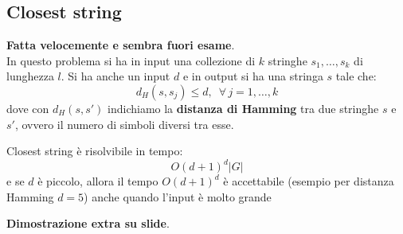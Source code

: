																      	\subsection{Closest string}
																      	\textbf{Fatta velocemente e sembra fuori esame}.\\
																      	In questo problema si ha in input una collezione di $k$ stringhe
																      	$s_1,\ldots,s_k$ di lunghezza $l$. Si ha anche un input $d$ e in output si ha
																      	una stringa $s$ tale che:
																      	\[d_H(s,s_j)\leq d,\,\,\,\forall\,j= 1,\ldots,k\]
																      	dove con $d_H(s,s')$ indichiamo la \textbf{distanza di Hamming} tra due stringhe
																      	$s$ e $s'$, ovvero il numero di simboli diversi tra esse.
																      	\begin{definizione}
																      		Closest string è risolvibile in tempo:
																      		\[O(d+1)^d|G|\]
																      		e se $d$ è piccolo, allora il tempo $O(d+1)^d$ è accettabile (esempio per
																      		distanza Hamming $d = 5$) anche quando l’input è molto grande  
																      	\end{definizione}
																      	\textbf{Dimostrazione extra su slide}.